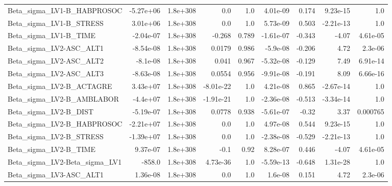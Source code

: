 \begin{tabular}{lrrrrrrrr}
Beta\_sigma\_LV1-B\_HABPROSOC    &   -5.27e+06 &     1.8e+308 &       0.0 &      1.0 &   4.01e-09 &       0.174 &     9.23e-15 &           1.0 \\
Beta\_sigma\_LV1-B\_STRESS       &    3.01e+06 &     1.8e+308 &       0.0 &      1.0 &   5.73e-09 &       0.503 &    -2.21e-13 &           1.0 \\
Beta\_sigma\_LV1-B\_TIME         &   -2.04e-07 &     1.8e+308 &    -0.268 &    0.789 &  -1.61e-07 &      -0.343 &        -4.07 &      4.61e-05 \\
Beta\_sigma\_LV2-ASC\_ALT1       &   -8.54e-08 &     1.8e+308 &    0.0179 &    0.986 &   -5.9e-08 &      -0.206 &         4.72 &       2.3e-06 \\
Beta\_sigma\_LV2-ASC\_ALT2       &    -8.1e-08 &     1.8e+308 &     0.041 &    0.967 &  -5.32e-08 &      -0.129 &         7.49 &      6.91e-14 \\
Beta\_sigma\_LV2-ASC\_ALT3       &   -8.63e-08 &     1.8e+308 &    0.0554 &    0.956 &  -9.91e-08 &      -0.191 &         8.09 &      6.66e-16 \\
Beta\_sigma\_LV2-B\_ACTAGRE      &    3.43e+07 &     1.8e+308 & -8.01e-22 &      1.0 &   4.21e-08 &       0.865 &    -2.67e-14 &           1.0 \\
Beta\_sigma\_LV2-B\_AMBLABOR     &    -4.4e+07 &     1.8e+308 & -1.91e-21 &      1.0 &  -2.36e-08 &      -0.513 &    -3.34e-14 &           1.0 \\
Beta\_sigma\_LV2-B\_DIST         &   -5.19e-07 &     1.8e+308 &    0.0778 &    0.938 &  -5.61e-07 &       -0.32 &         3.37 &      0.000765 \\
Beta\_sigma\_LV2-B\_HABPROSOC    &   -2.21e+07 &     1.8e+308 &       0.0 &      1.0 &   4.97e-08 &       0.544 &     9.23e-15 &           1.0 \\
Beta\_sigma\_LV2-B\_STRESS       &   -1.39e+07 &     1.8e+308 &       0.0 &      1.0 &  -2.38e-08 &      -0.529 &    -2.21e-13 &           1.0 \\
Beta\_sigma\_LV2-B\_TIME         &    9.37e-07 &     1.8e+308 &      -0.1 &     0.92 &   8.28e-07 &       0.446 &        -4.07 &      4.61e-05 \\
Beta\_sigma\_LV2-Beta\_sigma\_LV1 &      -858.0 &     1.8e+308 &  4.73e-36 &      1.0 &  -5.59e-13 &      -0.648 &     1.31e-28 &           1.0 \\
Beta\_sigma\_LV3-ASC\_ALT1       &    1.36e-08 &     1.8e+308 &       0.0 &      1.0 &    1.6e-08 &       0.151 &         4.72 &       2.3e-06 \\

\end{tabular}
